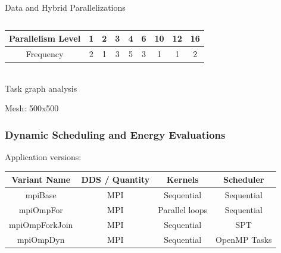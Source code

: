 \documentclass{beamer}
\begin{document}
\begin{frame}
\begin{columns}
\begin{column}{6cm}
\begin{center}
{\vspace{-1em}\small  Data and Hybrid Parallelizations}
\end{center}
\end{column}
\end{columns}
\medskip
\begin{center}
{\small
  \begin{tabular}{|c|c|c|c|c|c|c|c|c|}
    \hline 
   Parallelism Level & 1 & 2 & 3 & 4 & 6 & 10 & 12 & 16\\
   \hline
   Frequency & 2 & 1 & 3 & 5 & 3 & 1 & 1 & 2\\
   \hline
 \end{tabular}
  \\
  \medskip
 Task graph analysis
}
\end{center}
Mesh: 500x500
\end{frame}

\begin{frame}
  \frametitle{Dynamic Scheduling and Energy Evaluations}

  Application versions:
  \small
  \centering
\begin{tabular}{|c||c|c|c|}
  \hline
  Variant Name  & DDS / Quantity & Kernels & Scheduler \\
  \hline
  \hline
  mpiBase        & MPI & Sequential & Sequential \\
  \hline
  mpiOmpFor      & MPI & Parallel loops & Sequential \\
  \hline
  mpiOmpForkJoin & MPI & Sequential & SPT \\
  \hline
  mpiOmpDyn      & MPI & Sequential & OpenMP Tasks \\
  \hline
\end{tabular}

\end{frame}

\end{document}
